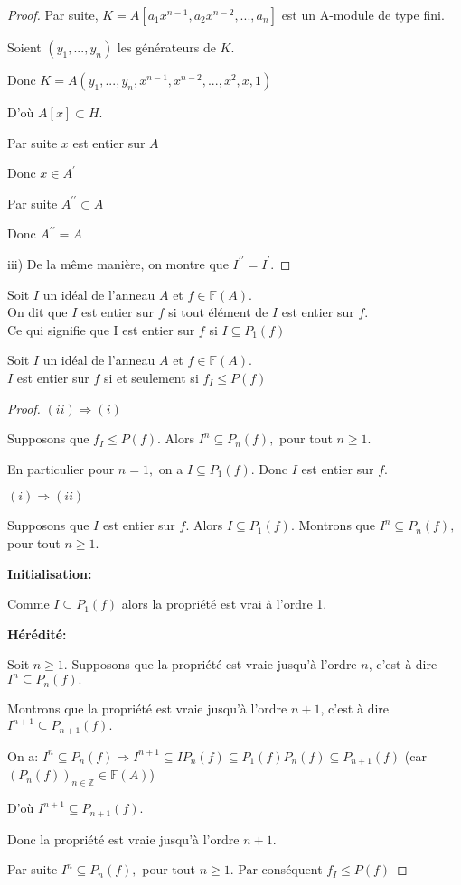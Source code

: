 \begin{proof}
	Par suite, $K=A[a_{1}x^{n-1},a_{2}x^{n-2},...,a_{n}]$ est un A-module de
	type fini.
	
	Soient $(y_{1},...,y_{n})$ les générateurs de $K.$
	
	Donc $K=A(y_{1},...,y_{n},x^{n-1},x^{n-2},...,x^{2},x,1)$
	
	D'où $A[x]\subset H.$
	
	Par suite $x$ est entier sur $A$
	
	Donc $x\in A^{\prime }$
	
	Par suite $A^{\prime \prime }\subset A$
	
	Donc  $A^{\prime \prime }=A$
	
	iii) De la m\^{e}me manière, on montre que $I^{\prime \prime }=I^{\prime
	}.$
\end{proof}
\begin{madefinition}
	Soit $I$ un idéal de l'anneau $A$ et $f \in \mathbb{F}(A)$. \\
	On dit que $I$ est entier sur $f$ si tout élément de $I$ est entier sur $f$. \\
	Ce qui signifie que I est entier sur $f$ si $I \subseteq P_1(f)$
\end{madefinition}
\begin{maconsequence}
	Soit $I$ un idéal de l'anneau $A$ et $f \in \mathbb{F}(A)$. \\
	$I$ est entier sur $f$ si et seulement si $f_I \leqslant P(f)$
\end{maconsequence}
\begin{proof}
	$(ii)\Longrightarrow (i)$
	
	Supposons que $f_{I}\leq P(f).$ Alors $I^{n}\subseteq P_{n}(f),$ pour tout $n\geq 1.$
	
	En particulier pour $n=1,$ on a $I\subseteq P_{1}(f).$ Donc $I$ est entier sur $f.$
	
	$(i)\Longrightarrow (ii)$
	
	Supposons que $I$ est entier sur $f.$ Alors $I\subseteq P_{1}(f).$ Montrons que $I^{n}\subseteq P_{n}(f),$ pour tout $n\geq 1.$
	
	\textbf{Initialisation:}
	
	Comme $I\subseteq P_{1}(f)$ alors la propriété est vrai à l'ordre 1.
	
	\textbf{Hérédité:}
	
	Soit $n\geq 1.$ Supposons que la propriété est vraie jusqu'à l'ordre $n$, c'est à dire $I^{n}\subseteq P_{n}(f).$
	
	Montrons que la propriété est vraie jusqu'à l'ordre $n+1$, c'est à dire $I^{n+1}\subseteq P_{n+1}(f).$
	
	On a: $I^{n}\subseteq P_{n}(f)\Longrightarrow I^{n+1}\subseteq
	IP_{n}(f)\subseteq P_{1}(f)P_{n}(f)\subseteq P_{n+1}(f)$ (car $%
	(P_{n}(f))_{n\in \mathbb{Z}}\in \mathbb{F}(A)$)
	
	D'où $I^{n+1}\subseteq P_{n+1}(f).$
	
	Donc la propriété est vraie jusqu'à l'ordre $n+1.$
	
	Par suite $I^{n}\subseteq P_{n}(f),$ pour tout $n\geq 1.$ Par conséquent $f_{I}\leq P(f)$
\end{proof}

